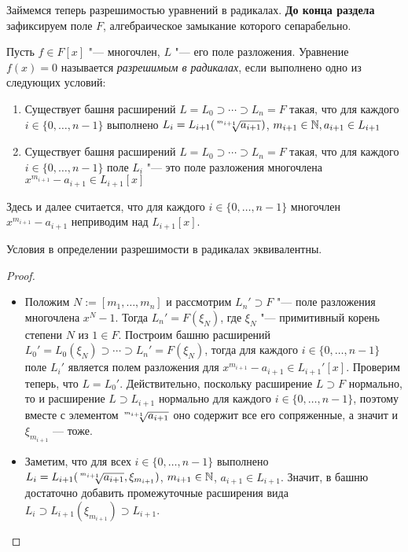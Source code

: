 Займемся теперь разрешимостью уравнений в радикалах. \textbf{До конца раздела} зафиксируем поле $F$, алгебраическое замыкание которого сепарабельно.
\pagebreak
\begin{definition}
	Пусть $f \in F[x]$ "--- многочлен, $L$ "--- его поле разложения. Уравнение $f(x) = 0$ называется \textit{разрешимым в радикалах}, если выполнено одно из следующих условий:
	\begin{enumerate}
		\item Существует башня расширений $L = L_0 \supset \dotsb \supset L_n = F$ такая, что для каждого $i \in \{0, \dotsc, n - 1\}$ выполнено $L_{i} = L_{i + 1}(\sqrt[\leftroot{2}\uproot{4}m_{i + 1}]{a_{i + 1}})$, $m_{i + 1} \in \mathbb{N}, a_{i + 1} \in L_{i + 1}$
		\item Существует башня расширений $L = L_0 \supset \dotsb \supset L_n = F$ такая, что для каждого $i \in \{0, \dotsc, n - 1\}$ поле $L_{i}$ "--- это поле разложения многочлена $x^{m_{i + 1}} - a_{i + 1} \in L_{i + 1}[x]$
	\end{enumerate}
	
	Здесь и далее считается, что для каждого $i \in \{0, \dotsc, n - 1\}$ многочлен $x^{m_{i + 1}} - a_{i + 1}$ неприводим над $L_{i+1}[x]$.
\end{definition}

\begin{proposition}
	Условия в определении разрешимости в радикалах эквивалентны.
\end{proposition}

\begin{proof}~
	\begin{itemize}
		\item{}Положим $N := [m_1, \dotsc, m_n]$ и рассмотрим $L_n' \supset F$ "--- поле разложения многочлена $x^N - 1$. Тогда $L_n' = F(\xi_N)$, где $\xi_N$ "--- примитивный корень степени $N$ из $1 \in F$. Построим башню расширений $L_0' = L_0(\xi_N) \supset \dotsb \supset L_n' = F(\xi_N)$, тогда для каждого $i \in \{0, \dotsc, n - 1\}$ поле $L_{i}'$ является полем разложения для $x^{m_{i+1}} - a_{i+1} \in L_{i+1}'[x]$. Проверим теперь, что $L = L_0'$. Действительно, поскольку расширение $L \supset F$ нормально, то и расширение $L \supset L_{i+1}$ нормально для каждого $i \in \{0, \dotsc, n-1\}$, поэтому вместе с элементом $\sqrt[\leftroot{2}\uproot{4}m_{i + 1}]{a_{i + 1}}$ оно содержит все его сопряженные, а значит и $\xi_{m_{i+1}}$ --- тоже.
		
		\item{}Заметим, что для всех $i \in \{0, \dotsc, n - 1\}$ выполнено $L_{i} = L_{i+1}(\sqrt[\leftroot{2}\uproot{4}m_{i+1}]{a_{i+1}}, \xi_{m_{i + 1}})$, $m_{i+1} \in \mathbb{N}$, $a_{i+1} \in L_{i+1}$. Значит, в башню достаточно добавить промежуточные расширения вида $L_{i} \supset L_{i + 1}(\xi_{m_{i + 1}}) \supset L_{i + 1}$.\qedhere
	\end{itemize}
\end{proof}

